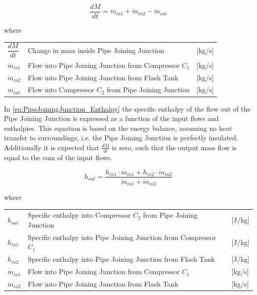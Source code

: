 \begin{equation} \label{eq:PipeJoiningJunction_ChangeOfMass}
	\frac{dM}{dt} = \dot{m}_{in1} + \dot{m}_{in2} - \dot{m}_{out}
\end{equation}


where

\begin{center}
	\begin{tabular}{l p{8cm} l}
		$\dfrac{dM}{dt}$ & Change in mass inside Pipe Joining Junction		 	& [\si{kg}/\si{s}]\\
		$\dot{m}_{in1}$ & Flow into Pipe Joining Junction from Compressor $ C_1 $ 		& [\si{kg}/\si{s}]\\
		$\dot{m}_{in2}$ & Flow into Pipe Joining Junction from Flash Tank 				& [\si{kg}/\si{s}]\\
		$\dot{m_{out}}$ & Flow into Compressor $ C_2 $ from Pipe Joining Junction		& [\si{kg}/\si{s}]\\
	\end{tabular}
\end{center}

In \cref{eq:PipeJoiningJunction_Enthalpy} the specific enthalpy of the flow out of the Pipe Joining Junction is expressed as a function of the input flows and enthalpies. This equation is based on the energy balance, assuming no heat transfer to surroundings, i.e. the Pipe Joining Junction is perfectly insulated. Additionally it is expected that $\frac{dM}{dt}$ is zero, such that the output mass flow is equal to the sum of the input flows. 

\begin{equation} \label{eq:PipeJoiningJunction_Enthalpy}
	h_{out} = \frac{h_{in1} \cdot \dot{m}_{in1} + h_{in2} \cdot \dot{m}_{in2}}{ \dot{m}_{in1} + \dot{m}_{in2} }
\end{equation}

where

\begin{center}
	\begin{tabular}{l p{10cm} l}
		$h_{out}$ 			& Specific enthalpy into Compressor $ C_2 $ from Pipe Joining Junction 			& [\si{J}/\si{kg}]\\
		$h_{in1}$ 			& Specific enthalpy into Pipe Joining Junction from Compressor $ C_1 $  					& [\si{J}/\si{kg}]\\
		$h_{in2}$ 			& Specific enthalpy into Pipe Joining Junction from Flash Tank   				& [\si{J}/\si{kg}]\\
		$\dot{m}_{in1}$ 	& Flow into Pipe Joining Junction from Compressor $ C_1 $ 		& [\si{kg}/\si{s}]\\
		$\dot{m}_{in2}$ 	& Flow into Pipe Joining Junction from Flash Tank 				& [\si{kg}/\si{s}]\\
	\end{tabular}
\end{center}


